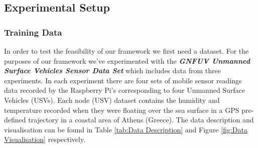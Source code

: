 \documentclass{mprop}
\begin{document}
\subsection{Experimental Setup}

\subsubsection{Training Data}

In order to test the feasibility of our framework we first need a dataset. For the purposes of our framework we've experimented with the \textbf{\textit{GNFUV Unmanned Surface Vehicles Sensor Data Set}} \cite{Dataset} which includes data from three experiments. In each experiment there are four sets of mobile sensor readings data recorded by the Raspberry Pi's corresponding to four Unmanned Surface Vehicles (USVs). Each node (USV) dataset contains the humidity and temperature recorded when they were floating over the sea surface in a GPS pre-defined trajectory in a coastal area of Athens (Greece). The data description and visualisation can be found in Table \ref{tab:Data Description} and Figure \ref{fig:Data Visualisation} respectively.
\end{document}
